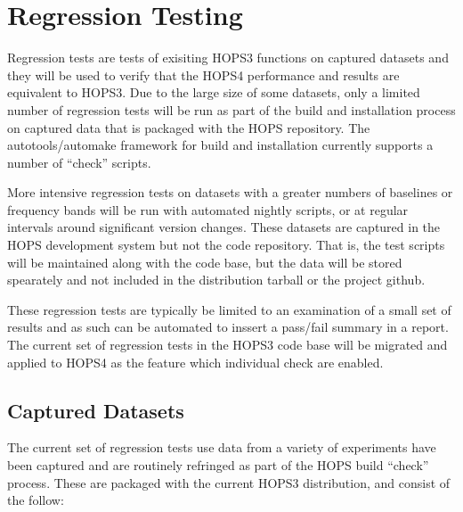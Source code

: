 %
\section{Regression Testing}
\label{sec:regress}

Regression tests are tests of exisiting HOPS3 functions on captured datasets and they will be used to verify that the HOPS4 performance and results are equivalent to HOPS3.  Due to the large size of some datasets, only a limited number of regression tests will be run as part of the build and installation process on captured data that is packaged with the HOPS repository.  The autotools/automake framework for build and installation currently supports a number of ``check'' scripts.

More intensive regression tests on datasets with a greater numbers of baselines or frequency bands will  be run with automated nightly scripts, or at regular intervals around significant version changes. These datasets are captured in the \ac{HOPS} development system but not the code repository.  That is, the test scripts will be maintained along with the code base, but the data will be stored spearately and not included in the distribution tarball or the project github.

These regression tests are typically be limited to an examination of a small set of results and as such can be automated to inssert a pass/fail summary in a report.
The current set of regression tests in the \ac{HOPS3} code base will be migrated and applied to \ac{HOPS4} as the feature which individual check are enabled. 



\subsection{Captured Datasets}
\label{sec:captdatareq}

The current set of regression tests use data from a variety of experiments have been captured and are routinely refringed as part of the HOPS build ``check'' process.  
These are packaged with the current \ac{HOPS3} distribution, and consist of the follow:


